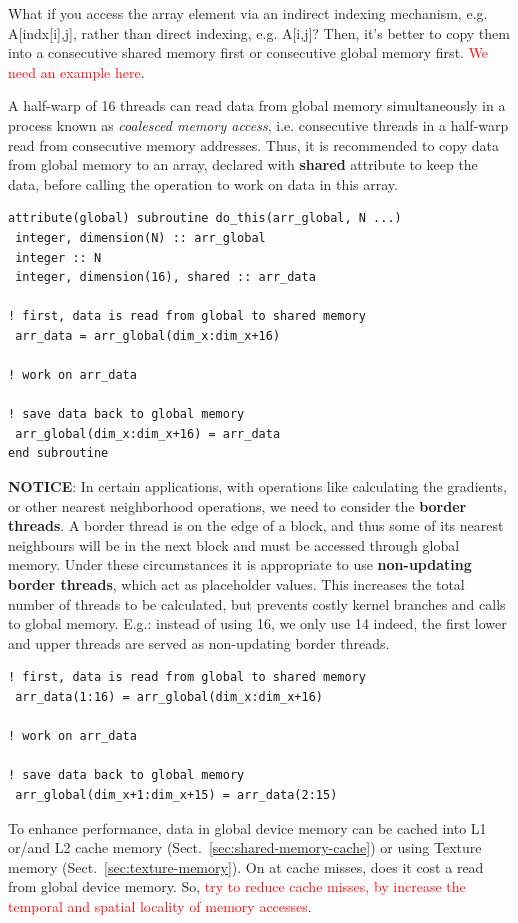 What if you access the array element via an indirect indexing
mechanism, e.g. A[indx[i],j], rather than direct indexing,
e.g. A[i,j]? Then, it's better to copy them into a consecutive shared
memory first or consecutive global memory first.
\textcolor{red}{We need an example here}.

A half-warp of 16 threads can read data from global memory
simultaneously in a process known as {\it coalesced memory access},
i.e. consecutive threads in a half-warp read from consecutive memory
addresses. Thus, it is recommended to copy data from global memory to
an array, declared with {\bf shared} attribute to keep the data,
before calling the operation to work on data in this array.
\begin{lstlisting}
attribute(global) subroutine do_this(arr_global, N ...)
 integer, dimension(N) :: arr_global
 integer :: N
 integer, dimension(16), shared :: arr_data

! first, data is read from global to shared memory
 arr_data = arr_global(dim_x:dim_x+16)

! work on arr_data

! save data back to global memory
 arr_global(dim_x:dim_x+16) = arr_data
end subroutine
\end{lstlisting}

{\bf NOTICE}: In certain applications, with operations like
calculating the gradients, or other nearest neighborhood operations,
we need to consider the {\bf border threads}. A border thread is on
the edge of a block, and thus some of its nearest neighbours will be
in the next block and must be accessed through global memory. Under
these circumstances it is appropriate to use
{\bf non-updating border threads}, which act as placeholder
values. This increases the total number of threads to be calculated,
but prevents costly kernel branches and calls to global memory. E.g.:
instead of using 16, we only use 14 indeed, the first lower and upper
threads are served as non-updating border threads.
\begin{lstlisting}
! first, data is read from global to shared memory
 arr_data(1:16) = arr_global(dim_x:dim_x+16)

! work on arr_data

! save data back to global memory
 arr_global(dim_x+1:dim_x+15) = arr_data(2:15)
\end{lstlisting}

To enhance performance, data in global device memory can be cached
into L1 or/and L2 cache memory (Sect.~\ref{sec:shared-memory-cache})
or using Texture memory (Sect.~\ref{sec:texture-memory}). On at cache
misses, does it cost a read from global device memory. So,
\textcolor{red}{try to reduce cache misses, by increase the temporal
  and spatial locality of memory accesses}.


